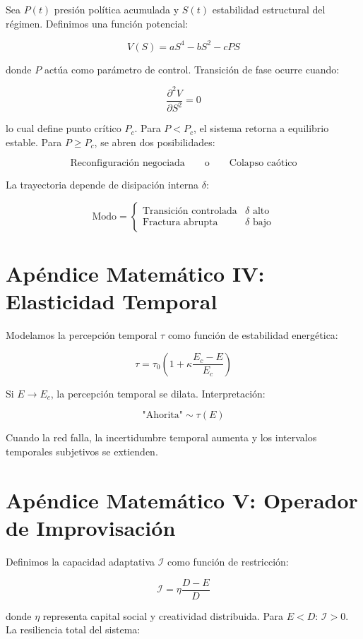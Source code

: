 \documentclass[12pt]{article}
\begin{document}
Sea \( P(t) \) presión política acumulada y \( S(t) \) estabilidad estructural del régimen. Definimos una función potencial:

\[
V(S) = aS^4 - bS^2 - cP S
\]

donde \( P \) actúa como parámetro de control. Transición de fase ocurre cuando:

\[
\frac{\partial^2 V}{\partial S^2} = 0
\]

lo cual define punto crítico \( P_c \). Para \( P < P_c \), el sistema retorna a equilibrio estable. Para \( P \ge P_c \), se abren dos posibilidades:

\[
\text{Reconfiguración negociada} \qquad \text{o} \qquad \text{Colapso caótico}
\]

La trayectoria depende de disipación interna \( \delta \):

\[
\text{Modo} =
\begin{cases}
\text{Transición controlada} & \delta \text{ alto} \\
\text{Fractura abrupta} & \delta \text{ bajo}
\end{cases}
\]

\section{Apéndice Matemático IV: Elasticidad Temporal}

Modelamos la percepción temporal \( \tau \) como función de estabilidad energética:

\[
\tau = \tau_0 \left(1 + \kappa \frac{E_c - E}{E_c}\right)
\]

Si \( E \to E_c \), la percepción temporal se dilata. Interpretación:

\[
\text{"Ahorita"} \sim \tau(E)
\]

Cuando la red falla, la incertidumbre temporal aumenta y los intervalos temporales subjetivos se extienden.

\section{Apéndice Matemático V: Operador de Improvisación}

Definimos la capacidad adaptativa \( \mathcal{I} \) como función de restricción:

\[
\mathcal{I} = \eta \frac{D - E}{D}
\]

donde \( \eta \) representa capital social y creatividad distribuida. Para \( E < D \): \( \mathcal{I} > 0 \). La resiliencia total del sistema:
\end{document}
